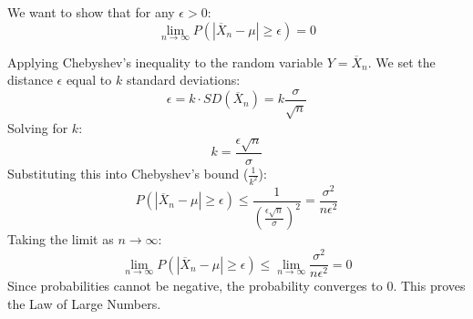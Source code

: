 \documentclass[12pt]{article}
\begin{document}
We want to show that for any $\epsilon > 0$:
\[ \lim_{n \to \infty} P(|\overline{X}_n - \mu| \ge \epsilon) = 0 \]

Applying Chebyshev's inequality to the random variable $Y = \overline{X}_n$. We set the distance $\epsilon$ equal to $k$ standard deviations:
\[ \epsilon = k \cdot SD(\overline{X}_n) = k \frac{\sigma}{\sqrt{n}} \]
Solving for $k$:
\[ k = \frac{\epsilon\sqrt{n}}{\sigma} \]
Substituting this into Chebyshev's bound ($\frac{1}{k^2}$):
\[ P(|\overline{X}_n - \mu| \ge \epsilon) \le \frac{1}{(\frac{\epsilon\sqrt{n}}{\sigma})^2} = \frac{\sigma^2}{n\epsilon^2} \]
Taking the limit as $n \to \infty$:
\[ \lim_{n \to \infty} P(|\overline{X}_n - \mu| \ge \epsilon) \le \lim_{n \to \infty} \frac{\sigma^2}{n\epsilon^2} = 0 \]
Since probabilities cannot be negative, the probability converges to 0. This proves the Law of Large Numbers.
\end{document}
